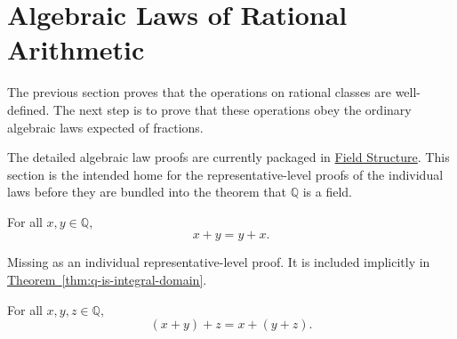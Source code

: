
\section{Algebraic Laws of Rational Arithmetic}
\label{sec:algebraic-laws-rational-arithmetic}

The previous section proves that the operations on rational classes are well-defined.  The next step is to prove that these operations obey the ordinary algebraic laws expected of fractions.

\begin{remark*}
The detailed algebraic law proofs are currently packaged in
\hyperref[sec:field-structure-q]{Field Structure}.  This section is the intended home for the representative-level proofs of the individual laws before they are bundled into the theorem that $\mathbb{Q}$ is a field.
\end{remark*}

\begin{tcolorbox}[colback=thmbox, colframe=thmborder, arc=2pt,
  left=6pt, right=6pt, top=4pt, bottom=4pt,
  title={\small\textbf{Theorem (Rational Addition Is Commutative)}},
  fonttitle=\small\bfseries]
\begin{theorem}
\label{thm:rational-addition-commutative}
For all $x,y\in\mathbb{Q}$,
\[
x+y=y+x.
\]
\end{theorem}
\end{tcolorbox}

\begin{remark*}[Status]
Missing as an individual representative-level proof. It is included implicitly in \hyperref[thm:q-is-integral-domain]{Theorem~\ref*{thm:q-is-integral-domain}}.
\end{remark*}

\begin{tcolorbox}[colback=thmbox, colframe=thmborder, arc=2pt,
  left=6pt, right=6pt, top=4pt, bottom=4pt,
  title={\small\textbf{Theorem (Rational Addition Is Associative)}},
  fonttitle=\small\bfseries]
\begin{theorem}
\label{thm:rational-addition-associative}
For all $x,y,z\in\mathbb{Q}$,
\[
(x+y)+z=x+(y+z).
\]
\end{theorem}
\end{tcolorbox}

